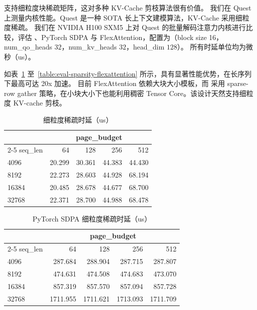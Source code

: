 \sys 支持细粒度块稀疏矩阵，这对多种 KV-Cache 剪枝算法很有价值。
我们在 Quest~\cite{tang2024quest} 上测量内核性能。Quest 是一种 SOTA 长上下文建模算法，KV-Cache 采用细粒度稀疏。
我们在 NVIDIA H100 SXM5 上对 Quest 的批量解码注意力内核进行比较，评估 \sys、PyTorch SDPA 与 FlexAttention，配置为（block size 16，num\_qo\_heads $32$，num\_kv\_heads $32$，head\_dim $128$）。
所有时延单位均为微秒（us）。

如表~\ref{table:eval-sparsity-flashinfer} 至~\ref{table:eval-sparsity-flexattention} 所示，\sys 具有显著性能优势，在长序列下最高可达 20x 加速。
目前 FlexAttention 依赖大块大小模板，而 \sys 采用 sparse-row gather 策略，在小块大小下也能利用稠密 Tensor Core。该设计天然支持细粒度 KV-cache 剪枝。

\begin{table}[hbt]
\small
\centering
\caption{\sys 细粒度稀疏时延（us）}
\label{table:eval-sparsity-flashinfer}
\begin{tabular}{@{}lrrrr@{}}
\toprule
\multicolumn{1}{c}{} & \multicolumn{4}{c}{page\_budget} \\
\cmidrule(l){2-5}
seq\_len & 64 & 128 & 256 & 512 \\
\midrule
4096  & 20.299 & 30.361 & 44.383 & 44.430 \\
8192  & 22.273 & 28.603 & 44.928 & 68.194 \\
16384 & 20.485 & 28.678 & 44.677 & 68.700 \\
32768 & 22.371 & 28.700 & 44.988 & 68.478 \\
\bottomrule
\end{tabular}
\end{table}

\begin{table}[hbt]
\small
\centering
\caption{PyTorch SDPA 细粒度稀疏时延（us）}
\label{table:eval-sparsity-torch}
\begin{tabular}{@{}lrrrr@{}}
\toprule
\multicolumn{1}{c}{} & \multicolumn{4}{c}{page\_budget} \\
\cmidrule(l){2-5}
seq\_len & 64 & 128 & 256 & 512 \\
\midrule
4096  & 287.684 & 288.904 & 287.715 & 287.807 \\
8192  & 474.631 & 474.508 & 474.683 & 473.070 \\
16384 & 857.319 & 857.570 & 857.094 & 857.728 \\
32768 & 1711.955 & 1711.621 & 1713.093 & 1711.709 \\
\bottomrule
\end{tabular}
\end{table}

